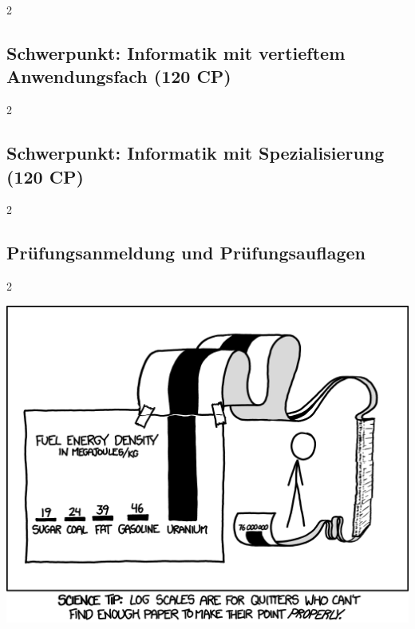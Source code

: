 \documentclass[a4paper,12pt]{scrartcl}
\newcommand{\spaltenanfang}{\begin{multicols}{2}}
\newcommand{\spaltenende}{\end{multicols}}
\begin{document}
\vspace{6mm}


\spaltenanfang

\spaltenende

\subsection{Schwerpunkt: Informatik mit vertieftem Anwendungsfach (120 CP)}

\vspace{10mm}


\spaltenanfang

\spaltenende

\subsection{Schwerpunkt: Informatik mit Spezialisierung (120 CP)}

\vspace{10mm}


\spaltenanfang

\spaltenende

\subsection{Prüfungsanmeldung und Prüfungsauflagen}
\spaltenanfang

\spaltenende

\vspace{15mm}
\begin{center}
\includegraphics[scale=0.8]{comics/log_scale}
\end{center}
\end{document}
